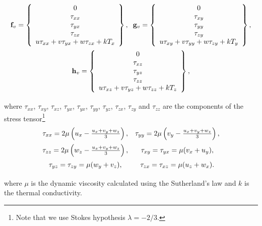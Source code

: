 \begin{equation}
\begin{array}{c} \vspace{0.2 cm}
\mathbf{f}_v =\left\{
\begin{array}{c}
0 \\
\tau_{xx} \\
\tau_{yx} \\ 
\tau_{zx} \\
u \tau_{xx} + v \tau_{yx} + w \tau_{zx} + k T_x
\end{array} \right\},  \hspace{0.2 cm}
\mathbf{g}_v =\left\{
\begin{array}{c}
0 \\
\tau_{xy} \\
\tau_{yy} \\ 
\tau_{zy} \\
u \tau_{xy} + v \tau_{yy} + w \tau_{zy} + k T_y
\end{array} \right\}, \\ \vspace{0.2 cm}
\mathbf{h}_v =\left\{
\begin{array}{c}
0 \\
\tau_{xz} \\
\tau_{yz} \\ 
\tau_{zz} \\
u \tau_{xz} + v \tau_{yz} + w \tau_{zz} + k T_z
\end{array} \right\},
\end{array} 
\label{viscous flux}
\end{equation}
where $\tau_{xx}$, $\tau_{xy}$, $\tau_{xz}$, $\tau_{yx}$, $\tau_{yx}$, 
$\tau_{yy}$, $\tau_{yz}$, $\tau_{zx}$, $\tau_{zy}$ and $\tau_{zz}$ are 
the components of the stress tensor\footnote{Note that we use Stokes 
hypothesis $\lambda = -2/3$.} 
\begin{equation}
\begin{array}{cc} \vspace{0.2 cm}
\tau_{xx} = 2 \mu \left( u_x - \frac{u_x + v_y + w_z}{3}  \right), &  \tau_{yy} = 
2 \mu \left( v_y - \frac{u_x + v_y + w_z}{3}  \right), \\  
\vspace{0.2 cm}\tau_{zz} = 2 \mu \left( w_z - \frac{u_x + v_y + w_z}{3}  \right), 
& \tau_{xy} = \tau_{yx} = \mu(v_x + u_y), \\  
\vspace{0.2 cm} \tau_{yz} = \tau_{zy} = \mu(w_y + v_z),  & \tau_{zx} = \tau_{xz} = 
\mu(u_z + w_x). \\
\end{array}
\end{equation}
where $\mu$ is the dynamic viscosity calculated using 
the Sutherland's law and $k$ is the thermal conductivity.

